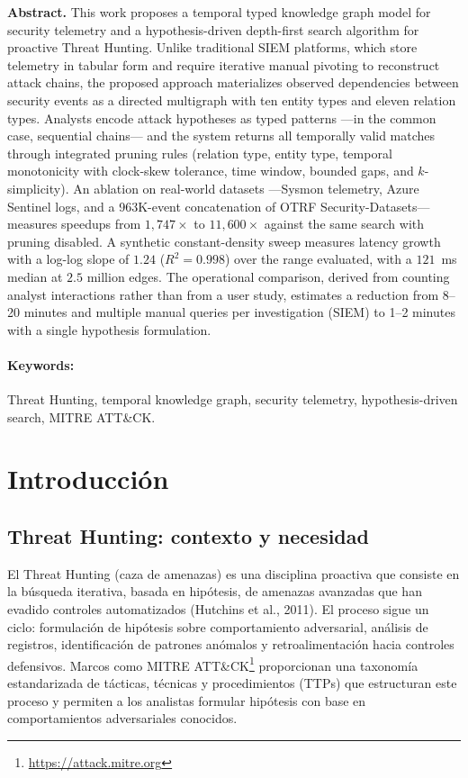 \documentclass[11pt,a4paper]{article}
\begin{document}
\textbf{Abstract.} This work proposes a temporal typed knowledge graph model
for security telemetry and a hypothesis-driven depth-first search algorithm for
proactive Threat Hunting. Unlike traditional SIEM platforms, which store
telemetry in tabular form and require iterative manual pivoting to reconstruct
attack chains, the proposed approach materializes observed dependencies between
security events as a directed multigraph with ten entity types and eleven
relation types. Analysts encode attack hypotheses as typed patterns ---in the
common case, sequential chains--- and the system returns all temporally valid
matches through integrated pruning rules (relation type, entity type, temporal
monotonicity with clock-skew tolerance, time window, bounded gaps, and
$k$-simplicity). An ablation on real-world datasets ---Sysmon telemetry, Azure
Sentinel logs, and a 963K-event concatenation of OTRF Security-Datasets---
measures speedups from $1{,}747\times$ to $11{,}600\times$ against the same
search with pruning disabled. A synthetic constant-density sweep measures
latency growth with a log-log slope of $1.24$ ($R^2 = 0.998$) over the range
evaluated, with a $121$~ms median at $2.5$ million edges. The operational
comparison, derived from counting analyst interactions rather than from a user
study, estimates a reduction from 8--20 minutes and multiple manual queries per
investigation (SIEM) to 1--2 minutes with a single hypothesis formulation.

\paragraph{Keywords:} Threat Hunting, temporal knowledge graph, security
telemetry, hypothesis-driven search, MITRE ATT\&CK.
\normalsize

\section{Introducción}

\subsection{Threat Hunting: contexto y necesidad}
El Threat Hunting (caza de amenazas) es una disciplina proactiva que consiste
en la búsqueda iterativa, basada en hipótesis, de amenazas avanzadas que han
evadido controles automatizados (Hutchins et al., 2011). El proceso sigue un
ciclo: formulación de hipótesis sobre comportamiento adversarial, análisis de
registros, identificación de patrones anómalos y retroalimentación hacia
controles defensivos. Marcos como MITRE ATT\&CK\footnote{\url{https://attack.mitre.org}}
proporcionan una taxonomía estandarizada de tácticas, técnicas y procedimientos
(TTPs) que estructuran este proceso y permiten a los analistas formular
hipótesis con base en comportamientos adversariales conocidos.
\end{document}
